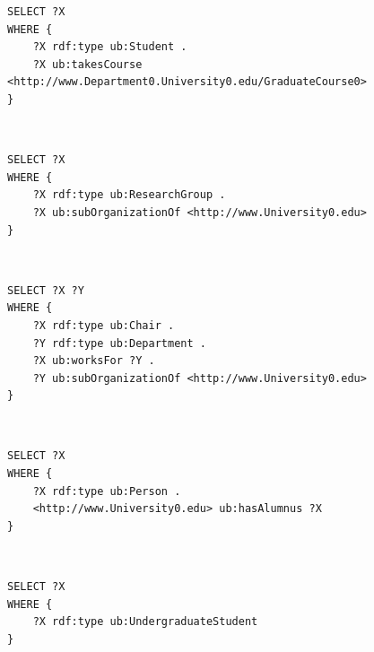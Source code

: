 \documentclass[10pt, a4paper]{report}
\begin{document}
\begin{enumerate}
\begin{minipage}{0.92\textwidth}
		\item \label{query:lumb_sparql_10}
		\lstset{language=sql}
		\begin{lstlisting}
SELECT ?X
WHERE {
    ?X rdf:type ub:Student .
    ?X ub:takesCourse <http://www.Department0.University0.edu/GraduateCourse0>
}
                        \end{lstlisting}
	\end{minipage} \\
	\begin{minipage}{0.92\textwidth}
		\item \label{query:lumb_sparql_11}
		\lstset{language=sql}
		\begin{lstlisting}
SELECT ?X
WHERE {
    ?X rdf:type ub:ResearchGroup .
    ?X ub:subOrganizationOf <http://www.University0.edu>
}
                        \end{lstlisting}
	\end{minipage} \\
	\begin{minipage}{0.92\textwidth}
		\item \label{query:lumb_sparql_12}
		\lstset{language=sql}
		\begin{lstlisting}
SELECT ?X ?Y
WHERE {
    ?X rdf:type ub:Chair .
    ?Y rdf:type ub:Department .
    ?X ub:worksFor ?Y .
    ?Y ub:subOrganizationOf <http://www.University0.edu>
}
                        \end{lstlisting}
	\end{minipage} \\
	\begin{minipage}{0.92\textwidth}
		\item \label{query:lumb_sparql_13}
		\lstset{language=sql}
		\begin{lstlisting}
SELECT ?X
WHERE {
    ?X rdf:type ub:Person .
    <http://www.University0.edu> ub:hasAlumnus ?X
}
                        \end{lstlisting}
	\end{minipage} \\
	\begin{minipage}{0.92\textwidth}
		\item \label{query:lumb_sparql_14}
		\lstset{language=sql}
		\begin{lstlisting}
SELECT ?X
WHERE {
    ?X rdf:type ub:UndergraduateStudent
}
                        \end{lstlisting}
	\end{minipage} \\
\end{enumerate}
\end{document}
